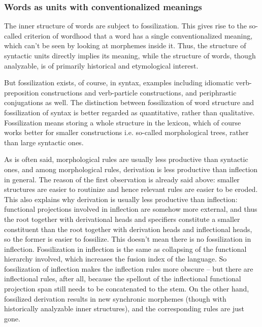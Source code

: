 \documentclass[UTF8, a4paper, oneside, scheme=plain]{ctexart}
\begin{document}
\subsubsection{Words as units with conventionalized meanings}\label{sec:word-meaning}

The inner structure of words are subject to fossilization.
This gives rise to the so-called criterion of wordhood 
that a word has a single conventionalized meaning,
which can't be seen by looking at morphemes inside it.
Thus, the structure of syntactic units directly implies its meaning,
while the structure of words,
though analyzable,
is of primarily historical and etymological interest.

But fossilization exists, of course, in syntax,
examples including idiomatic verb-preposition constructions 
and verb-particle constructions,
and periphrastic conjugations as well.
The distinction between fossilization of word structure and fossilization of syntax 
is better regarded as quantitative, rather than qualitative.
Fossilization means storing a whole structure in the lexicon,
which of course works better for smaller constructions i.e. so-called morphological trees,
rather than large syntactic ones.

As is often said, morphological rules are usually less productive than syntactic ones,
and among morphological rules,
derivation is less productive than inflection in general.
The reason of the first observation is already said above:
smaller structures are easier to routinize 
and hence relevant rules are easier to be eroded.
This also explains why derivation is usually less productive than inflection:
functional projections involved in inflection are somehow more external,
and thus the root together with derivational heads and specifiers
constitute a smaller constituent than 
the root together with derivation heads and inflectional heads,
so the former is easier to fossilize.
This doesn't mean there is no fossilization in inflection.
Fossilization in inflection is the same as collapsing of the functional hierarchy involved,
which increases the fusion index of the language.
So fossilization of inflection makes the inflection rules more obscure 
-- but there are inflectional rules, after all,
because the spellout of the inflectional functional projection span 
still needs to be concatenated to the stem.
On the other hand, 
fossilized derivation results in new synchronic morphemes 
(though with historically analyzable inner structures),
and the corresponding rules are just gone.
\end{document}
